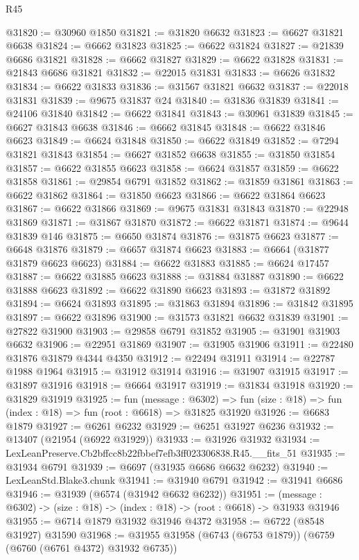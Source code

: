 \begin{lexlean}{R45}
\begin{coremodule}
{@31820 := @30960 @1850
@31821 := @31820 @6632
@31823 := @6627 @31821 @6638
@31824 := @6662 @31823
@31825 := @6622 @31824
@31827 := @21839 @6686 @31821
@31828 := @6662 @31827
@31829 := @6622 @31828
@31831 := @21843 @6686 @31821
@31832 := @22015 @31831
@31833 := @6626 @31832
@31834 := @6622 @31833
@31836 := @31567 @31821 @6632
@31837 := @22018 @31831
@31839 := @9675 @31837 @24
@31840 := @31836 @31839
@31841 := @24106 @31840
@31842 := @6622 @31841
@31843 := @30961 @31839
@31845 := @6627 @31843 @6638
@31846 := @6662 @31845
@31848 := @6622 @31846 @6623
@31849 := @6624 @31848
@31850 := @6622 @31849
@31852 := @7294 @31821 @31843
@31854 := @6627 @31852 @6638
@31855 := @31850 @31854
@31857 := @6622 @31855 @6623
@31858 := @6624 @31857
@31859 := @6622 @31858
@31861 := @29854 @6791 @31852
@31862 := @31859 @31861
@31863 := @6622 @31862
@31864 := @31850 @6623
@31866 := @6622 @31864 @6623
@31867 := @6622 @31866
@31869 := @9675 @31831 @31843
@31870 := @22948 @31869
@31871 := @31867 @31870
@31872 := @6622 @31871
@31874 := @9644 @31839 @146
@31875 := @6650 @31874
@31876 := @31875 @6623
@31877 := @6648 @31876
@31879 := @6657 @31874 @6623
@31883 := @6664 (@31877 @31879 @6623 @6623)
@31884 := @6622 @31883
@31885 := @6624 @17457
@31887 := @6622 @31885 @6623
@31888 := @31884 @31887
@31890 := @6622 @31888 @6623
@31892 := @6622 @31890 @6623
@31893 := @31872 @31892
@31894 := @6624 @31893
@31895 := @31863 @31894
@31896 := @31842 @31895
@31897 := @6622 @31896
@31900 := @31573 @31821 @6632 @31839
@31901 := @27822 @31900
@31903 := @29858 @6791 @31852
@31905 := @31901 @31903 @6632
@31906 := @22951 @31869
@31907 := @31905 @31906
@31911 := @22480 @31876 @31879 @4344 @4350
@31912 := @22494 @31911
@31914 := @22787 @1988 @1964
@31915 := @31912 @31914
@31916 := @31907 @31915
@31917 := @31897 @31916
@31918 := @6664 @31917
@31919 := @31834 @31918
@31920 := @31829 @31919
@31925 := fun (message : @6302) =>
  fun (size : @18) => fun (index : @18) => fun (root : @6618) => @31825 @31920
@31926 := @6683 @1879
@31927 := @6261 @6232
@31929 := @6251 @31927 @6236
@31932 := @13407 (@21954 (@6922 @31929))
@31933 := @31926 @31932
@31934 := LexLeanPreserve.Cb2bffcc8b22fbbef7efb3ff023306838.R45.__fits_51
@31935 := @31934 @6791
@31939 := @6697 (@31935 @6686 @6632 @6232)
@31940 := LexLeanStd.Blake3.chunk
@31941 := @31940 @6791
@31942 := @31941 @6686
@31946 := @31939 (@6574 (@31942 @6632 @6232))
@31951 := (message : @6302) -> (size : @18) -> (index : @18) -> (root : @6618) -> @31933 @31946
@31955 := @6714 @1879 @31932 @31946 @4372
@31958 := @6722 (@8548 @31927) @31590
@31968 := @31955 @31958 (@6743 (@6753 @1879)) (@6759 (@6760 (@6761 @4372) @31932 @6735))
}
\end{coremodule}
\end{lexlean}
